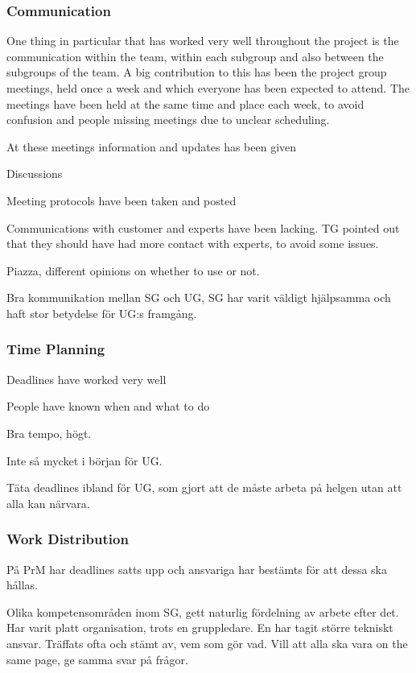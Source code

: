 \documentclass[a4paper]{article}
\begin{document}
\subsubsection{Communication}
One thing in particular that has worked very well throughout the project is the communication within the team, within each subgroup and also between the subgroups of the team. A big contribution to this has been the project group meetings, held once a week and which everyone has been expected to attend. The meetings have been held at the same time and place each week, to avoid confusion and people missing meetings due to unclear scheduling. 

At these meetings information and updates has been given 

Discussions

Meeting protocols have been taken and posted

Communications with customer and experts have been lacking. TG pointed out that they should have had more contact with experts, to avoid some issues.

Piazza, different opinions on whether to use or not.

Bra kommunikation mellan SG och UG, SG har varit väldigt hjälpsamma och haft stor betydelse för UG:s framgång.

\subsubsection{Time Planning}
Deadlines have worked very well

People have known when and what to do

Bra tempo, högt.

Inte så mycket i början för UG. 

Täta deadlines ibland för UG, som gjort att de måste arbeta på helgen utan att alla kan närvara. 

\subsubsection{Work Distribution}

På PrM har deadlines satts upp och ansvariga har bestämts för att dessa ska hållas.

Olika kompetensområden inom SG, gett naturlig fördelning av arbete efter det. Har varit platt organisation, trots en gruppledare. En har tagit större tekniskt ansvar. Träffats ofta och stämt av, vem som gör vad. Vill att alla ska vara on the same page, ge samma svar på frågor.
\end{document}
